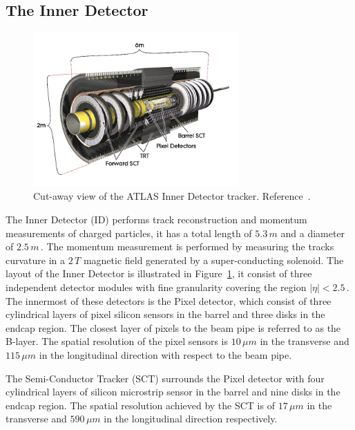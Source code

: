 \subsection{The Inner Detector}

\begin{figure}[tp]
     \begin{center}

            \includegraphics[width=0.7\textwidth]{figure/Inner_detector.jpg}

    \end{center}
    \caption{Cut-away view of the ATLAS Inner Detector tracker. Reference~\cite{ATLASDetector}.}

   \label{fig:atlasID}
\end{figure}


The Inner Detector (ID) performs track reconstruction  and momentum measurements of charged particles, it has a total length of $5.3\,m$ and a diameter of $2.5\,m\,.$
The momentum measurement is performed by measuring the tracks curvature in a $2\,T$ magnetic field generated by 
a super-conducting solenoid. The layout of the Inner Detector is illustrated in Figure~\ref{fig:atlasID},
it consist of three independent detector modules with fine granularity
covering the region $|\eta| < 2.5\,.$ The innermost of these detectors is the Pixel detector,
which consist of three cylindrical layers of pixel silicon sensors in the barrel and three disks in the endcap region. The closest layer of pixels to the beam pipe is
referred to as the B-layer. The spatial resolution of the pixel sensors is $10\,\mu m$ in the transverse and $115\,\mu m$ in the longitudinal
direction with respect to the beam pipe.

The Semi-Conductor Tracker (SCT) surrounds the Pixel detector with four cylindrical layers of silicon microstrip sensor in the barrel
and nine disks in the  endcap region. The spatial resolution achieved by the SCT is of $17\,\mu m$ in the transverse and $590\,\mu m$ in the longitudinal direction 
respectively.

